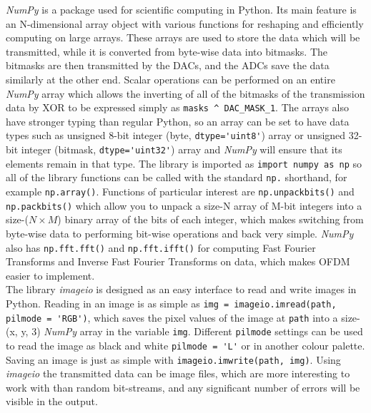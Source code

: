 \documentclass[../main.tex]{subfiles}
\begin{document}
\textit{NumPy} is a package used for scientific computing in Python.
Its main feature is an N-dimensional array object with various functions for reshaping and efficiently computing on large arrays.
These arrays are used to store the data which will be transmitted, while it is converted from byte-wise data into bitmasks.
The bitmasks are then transmitted by the DACs, and the ADCs save the data similarly at the other end.
Scalar operations can be performed on an entire \textit{NumPy} array which allows the inverting of all of the bitmasks of the transmission data by XOR to be expressed simply as \colorbox{backcolour}{\lstinline{masks ^ DAC_MASK_1}}.
The arrays also have stronger typing than regular Python, so an array can be set to have data types such as unsigned 8-bit integer (byte, \colorbox{backcolour}{\lstinline{dtype='uint8'}}) array or unsigned 32-bit integer (bitmask, \colorbox{backcolour}{\lstinline{dtype='uint32'}}) array and \textit{NumPy} will ensure that its elements remain in that type.
The library is imported as \colorbox{backcolour}{\lstinline{import numpy as np}} so all of the library functions can be called with the standard \colorbox{backcolour}{\lstinline{np.}} shorthand, for example \colorbox{backcolour}{\lstinline{np.array()}}.
Functions of particular interest are \colorbox{backcolour}{\lstinline{np.unpackbits()}} and \colorbox{backcolour}{\lstinline{np.packbits()}} which allow you to unpack a size-N array of M-bit integers into a size-($N\times M$) binary array of the bits of each integer, which makes switching from byte-wise data to performing bit-wise operations and back very simple.
\textit{NumPy} also has \colorbox{backcolour}{\lstinline{np.fft.fft()}} and \colorbox{backcolour}{\lstinline{np.fft.ifft()}} for computing Fast Fourier Transforms and Inverse Fast Fourier Transforms on data, which makes OFDM easier to implement.\\

The library \textit{imageio} is designed as an easy interface to read and write images in Python.
Reading in an image is as simple as \colorbox{backcolour}{\lstinline{img = imageio.imread(path, pilmode = 'RGB')}}, which saves the pixel values of the image at \colorbox{backcolour}{\lstinline{path}} into a size-(x, y, 3) \textit{NumPy} array in the variable \colorbox{backcolour}{\lstinline{img}}.
Different \colorbox{backcolour}{\lstinline{pilmode}} settings can be used to read the image as black and white \colorbox{backcolour}{\lstinline{pilmode = 'L'}} or in another colour palette.
Saving an image is just as simple with \colorbox{backcolour}{\lstinline{imageio.imwrite(path, img)}}.
Using \textit{imageio} the transmitted data can be image files, which are more interesting to work with than random bit-streams, and any significant number of errors will be visible in the output.\\
\end{document}
